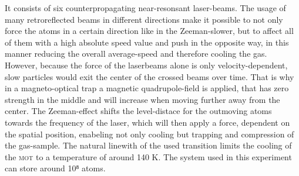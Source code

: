 It consists of six counterpropagating near-resonsant laser-beams. The usage of many retroreflected beams in different directions make it possible to not only force the atoms in a certain direction like in the Zeeman-slower, but to affect all of them with a high absolute speed value and push in the opposite way, in this manner reducing the overall average-speed and therefore cooling the gas. However, because the force of the laserbeams alone is only velocity-dependent, slow particles would exit the center of the crossed beams over time. That is why in a magneto-optical trap a magnetic quadrupole-field is applied, that has zero strength in the middle and will increase when moving further away from the center. The Zeeman-effect shifts the level-distace for the outmoving atoms towards the frequency of the laser, which will then apply a force, dependent on the spatial position, enabeling not only cooling but trapping and compression of the gas-sample. The natural linewith of the used transition limits the cooling of the \textsc{mot} to a temperature of around 140 \mu K. The system used in this experiment can store around 10⁸ atoms. 

